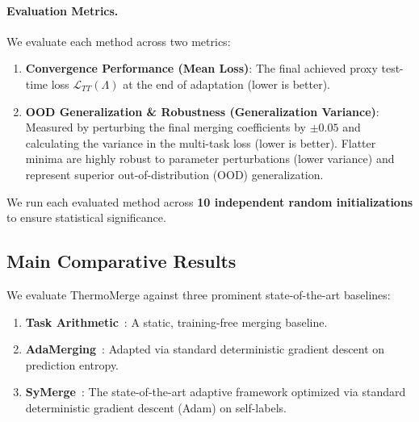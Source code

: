 \paragraph{Evaluation Metrics.} We evaluate each method across two metrics:
\begin{enumerate}
\item \textbf{Convergence Performance (Mean Loss)}: The final achieved proxy test-time loss $\mathcal{L}_{TT}(\Lambda)$ at the end of adaptation (lower is better).
\item \textbf{OOD Generalization \& Robustness (Generalization Variance)}: Measured by perturbing the final merging coefficients by $\pm 0.05$ and calculating the variance in the multi-task loss (lower is better).
Flatter minima are highly robust to parameter perturbations (lower variance) and represent superior out-of-distribution (OOD) generalization.
\end{enumerate}
We run each evaluated method across \textbf{10 independent random initializations} to ensure statistical significance.

\subsection{Main Comparative Results}
We evaluate ThermoMerge against three prominent state-of-the-art baselines:
\begin{enumerate}
    \item \textbf{Task Arithmetic}~\cite{ilharco2022editing}: A static, training-free merging baseline.
    \item \textbf{AdaMerging}~\cite{yang2024adamerging}: Adapted via standard deterministic gradient descent on prediction entropy.
\item \textbf{SyMerge}~\cite{jung2025symerge}: The state-of-the-art adaptive framework optimized via standard deterministic gradient descent (Adam) on self-labels.
\end{enumerate}

